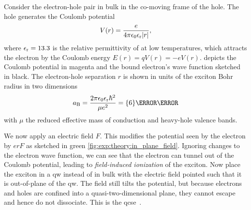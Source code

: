Consider the electron-hole pair in bulk  in the co-moving frame of the hole.
The hole generates the Coulomb potential
\begin{equation}
    V(r) = \frac{e}{4\pi\epsilon_0\epsilon_{\mathrm{r}}\abs{r}},
\end{equation}
where $\epsilon_{\mathrm{r}} = \num{13.3}$ is the relative permittivity of  at low temperatures, which attracts the electron by the Coulomb energy $E(r) = qV(r) = -eV(r)$.
 depicts the Coulomb potential in magenta and the bound electron's wave function sketched in black.
The electron-hole separation $r$ is shown in units of the exciton Bohr radius in two dimensions~\cite{Olsen2016}
\begin{equation}
    a_{\mr{B}} = \frac{2\pi\eps_0\eps_{\mr{r}}\hbar^2}{\mu e^2} = \qty{6}{\nano\meter}
\end{equation}
with $\mu$ the reduced effective mass of conduction and heavy-hole valence bands.

We now apply an electric field $F$.
This modifies the potential seen by the electron by $erF$ as sketched in green \cref{fig:exp:theory:in_plane_field}.
Ignoring changes to the electron wave function, we can see that the electron can tunnel out of the Coulomb potential, leading to \emph{field-induced ionization} of the exciton.
Now place the exciton in a \gls{qw} instead of in bulk with the electric field pointed such that it is out-of-plane of the \gls{qw}.
The field still tilts the potential, but because electrons and holes are confined into a quasi-two-dimensional plane, they cannot escape and hence do not dissociate.
This is the \gls{qcse}~\cite{Miller1984}.

